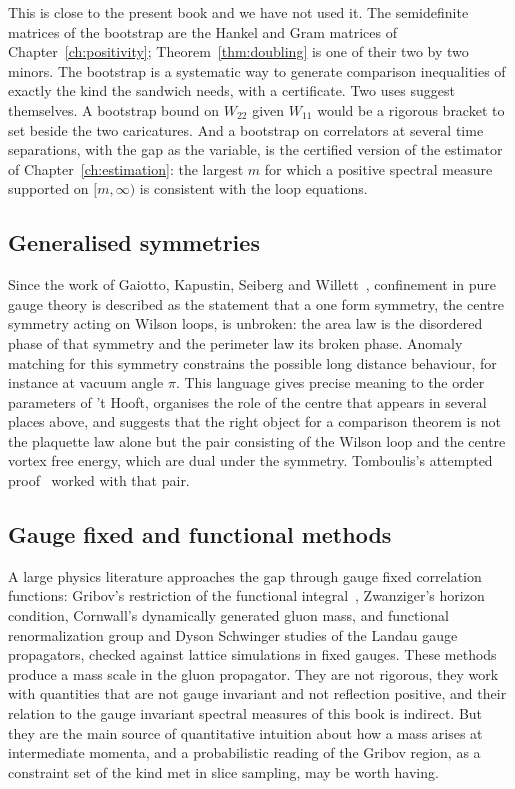 This is close to the present book and we have not used it. The semidefinite matrices of the bootstrap are the Hankel and Gram matrices of Chapter~\ref{ch:positivity}; Theorem~\ref{thm:doubling} is one of their two by two minors. The bootstrap is a systematic way to generate comparison inequalities of exactly the kind the sandwich needs, with a certificate. Two uses suggest themselves. A bootstrap bound on $W_{22}$ given $W_{11}$ would be a rigorous bracket to set beside the two caricatures. And a bootstrap on correlators at several time separations, with the gap as the variable, is the certified version of the estimator of Chapter~\ref{ch:estimation}: the largest $m$ for which a positive spectral measure supported on $[m,\infty)$ is consistent with the loop equations.

\subsection{Generalised symmetries}

Since the work of Gaiotto, Kapustin, Seiberg and Willett~\cite{GKSW}, confinement in pure gauge theory is described as the statement that a one form symmetry, the centre symmetry acting on Wilson loops, is unbroken: the area law is the disordered phase of that symmetry and the perimeter law its broken phase. Anomaly matching for this symmetry constrains the possible long distance behaviour, for instance at vacuum angle $\pi$. This language gives precise meaning to the order parameters of 't Hooft, organises the role of the centre that appears in several places above, and suggests that the right object for a comparison theorem is not the plaquette law alone but the pair consisting of the Wilson loop and the centre vortex free energy, which are dual under the symmetry. Tomboulis's attempted proof~\cite{To07} worked with that pair.

\subsection{Gauge fixed and functional methods}

A large physics literature approaches the gap through gauge fixed correlation functions: Gribov's restriction of the functional integral~\cite{Gr78}, Zwanziger's horizon condition, Cornwall's dynamically generated gluon mass, and functional renormalization group and Dyson Schwinger studies of the Landau gauge propagators, checked against lattice simulations in fixed gauges. These methods produce a mass scale in the gluon propagator. They are not rigorous, they work with quantities that are not gauge invariant and not reflection positive, and their relation to the gauge invariant spectral measures of this book is indirect. But they are the main source of quantitative intuition about how a mass arises at intermediate momenta, and a probabilistic reading of the Gribov region, as a constraint set of the kind met in slice sampling, may be worth having.

